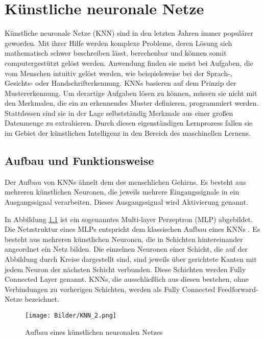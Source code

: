 \chapter[Künstliche neuronale Netze (Schmelzer)]{Künstliche neuronale Netze}

Künstliche neuronale Netze (KNN) sind in den letzten Jahren immer populärer geworden. Mit ihrer Hilfe werden komplexe Probleme, deren Lösung sich mathematisch schwer beschreiben lässt, berechenbar und können somit computergestützt gelöst werden. Anwendung finden sie meist bei Aufgaben, die vom Menschen intuitiv gelöst werden, wie beispielsweise bei der Sprach-, Gesichts- oder Handschrifterkennung. KNNs basieren auf dem Prinzip der Mustererkennung. Um derartige Aufgaben lösen zu können, müssen sie nicht mit den Merkmalen, die ein zu erkennendes Muster definieren, programmiert werden. Stattdessen sind sie in der Lage selbstständig Merkmale aus einer großen Datenmenge zu extrahieren. Durch diesen eigenständigen Lernprozess fallen sie im Gebiet der künstlichen Intelligenz in den Bereich des maschinellen Lernens.  

\section[Aufbau und Funktionsweise (Schmelzer)]{Aufbau und Funktionsweise}

Der Aufbau von KNNs ähnelt dem des menschlichen Gehirns. Es besteht aus mehreren künstlichen Neuronen, die jeweils mehrere Eingangssignale in ein Ausgangssignal verarbeiten. Dieses Ausgangssignal wird Aktivierung genannt. 

In Abbildung \ref{fig:aufbau-knn} ist ein sogenanntes Multi-layer Perzeptron (MLP) abgebildet. Die Netzstruktur eines MLPs entspricht dem klassischen Aufbau eines KNNs \linebreak \cite{Goodfellow2016}. Es besteht aus mehreren künstlichen Neuronen, die in Schichten hin\-ter\-ein\-an\-der angeordnet ein Netz bilden. Die einzelnen Neuronen einer Schicht, die auf der Abbildung durch Kreise dargestellt sind, sind jeweils über gerichtete Kanten mit jedem Neuron der nächsten Schicht verbunden. Diese Schichten werden Fully Connected Layer genannt. KNNs, die ausschließlich aus diesen bestehen, ohne Verbindungen zu vorherigen Schichten, werden als Fully Connected Feedforward-Netze bezeichnet. 

\begin{figure}
    \centering
    \texttt{[image: Bilder/KNN\_2.png]}
    \caption{Aufbau eines künstlichen neuronalen Netzes}
    \label{fig:aufbau-knn}
\end{figure}

